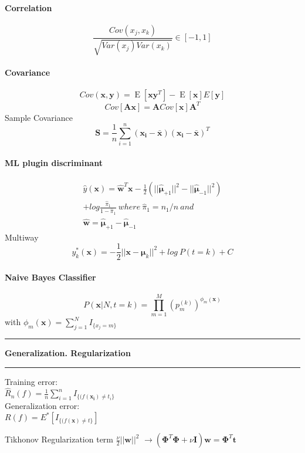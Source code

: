 \documentclass[7pt]{scrartcl}
\newlength{\secskip}
\renewcommand{\section}[1]{
  \vspace{\secskip}
  \hrule\vspace{.3em}
  \textbf{#1}
  \vspace{.3em}
  \hrule
  \vspace{\secskip}
}
\DeclareMathOperator{\E}{E}
\renewcommand{\vec}{\mathbf}
\begin{document}
\begin{multicols}{4}
\paragraph{Correlation}
\[\frac{Cov(x_j,x_k)}{\sqrt{Var(x_j)Var(x_k)}} \in [-1,1]\]

\paragraph{Covariance}
$$Cov(\vec x, \vec y) = \E[\vec x \vec y ^ T] - \E[\vec x]E[\vec y]$$
$$Cov[\vec A \vec x] = \vec A Cov[\vec x] \vec A^T$$
Sample Covariance 
\[\vec{S} = \frac{1}{n} \sum_{i=1}^n (\vec{x_i - \bar{x}})(\vec{x_i - \bar{x}})^T\]
\paragraph{ML plugin discriminant}
\begin{equation*}
\begin{split}
\hat{y}(\vec{x}) = \hat{\vec{w}}^T \vec{x} - \frac{1}{2}(||\hat{\vec{\mu}}_{+1} ||^2 - || \hat{\vec{\mu}}_{-1} ||^2) \\ + log\frac{\hat{\pi}_1}{1-\hat{\pi}_1} ~ where~ \hat{\pi}_1 = n_1 / n ~ and~  \\ \hat{\vec{w}}=\hat{\vec{\mu}}_{+1} - \hat{\vec{\mu}}_{-1}
\end{split}
\end{equation*}
Multiway \[y_k^*(\vec{x}) = -\frac{1}{2}||\vec{x}-\vec{\mu}_k||^2 + log~P(t=k) + C\]

\paragraph{Naive Bayes Classifier}
\[ P(\vec x | N,t=k) = \prod_{m=1}^M \left ( p_m^{(k)} \right
)^{\phi_m(\vec x)} \]
with $\phi_m(\vec x) = \sum_{j=1}^N I_{\{x_j = m\}}$

\section{Generalization. Regularization}
Training error: \\
$\hat{R}_n(f) = \frac{1}{n} \sum_{i=1}^n I_{\{(f(\vec{x_i}) \neq t_i\}}$ \\
Generalization error: \\
$R(f) = E^*[I_{\{(f(\vec{x}) \neq t\}}]$

Tikhonov Regularization term $\frac{\nu}{2} ||\vec{w}||^2$
$\rightarrow (\vec{\Phi}^T \vec{\Phi} + \nu \vec{I})\vec{w} = \vec{\Phi}^T \vec{t}$


\end{multicols}
\end{document}
